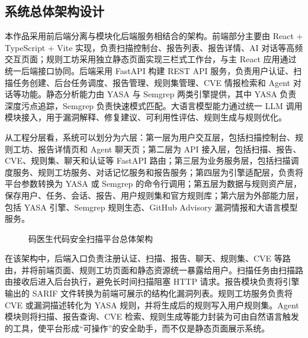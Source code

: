 \documentclass[a4paper,12pt,UTF8]{ctexart}
\numberwithin{figure}{section}
\numberwithin{table}{section}
\numberwithin{equation}{section}
\begin{document}
\subsection{系统总体架构设计}

{\songti
本作品采用前后端分离与模块化后端服务相结合的架构。前端部分主要由 React + TypeScript + Vite 实现，负责扫描控制台、报告列表、报告详情、AI 对话等高频交互页面；规则工坊采用独立静态页面实现三栏式工作台，与主 React 应用通过统一后端接口协同。后端采用 FastAPI 构建 REST API 服务，负责用户认证、扫描任务创建、后台任务调度、报告管理、规则集管理、CVE 情报检索和 Agent 对话等功能。静态分析能力由 YASA 与 Semgrep 两类引擎提供，其中 YASA 负责深度污点追踪，Semgrep 负责快速模式匹配。大语言模型能力通过统一 LLM 调用模块接入，用于漏洞解释、修复建议、可利用性评估、规则生成与规则优化。

从工程分层看，系统可以划分为六层：第一层为用户交互层，包括扫描控制台、规则工坊、报告详情页和 Agent 聊天页；第二层为 API 接入层，包括扫描、报告、CVE、规则集、聊天和认证等 FastAPI 路由；第三层为业务服务层，包括扫描调度服务、规则工坊服务、对话记忆服务和报告服务；第四层为引擎适配层，负责将平台参数转换为 YASA 或 Semgrep 的命令行调用；第五层为数据与规则资产层，保存用户、任务、会话、报告、用户规则集和官方规则库；第六层为外部能力层，包括 YASA 引擎、Semgrep 规则生态、GitHub Advisory 漏洞情报和大语言模型服务。
\par}

\begin{figure}[htbp]
\centering
{}
\caption{码医生代码安全扫描平台总体架构}
\label{fig:system-architecture}
\end{figure}

{\songti
在该架构中，后端入口负责注册认证、扫描、报告、聊天、规则集、CVE 等路由，并将前端页面、规则工坊页面和静态资源统一暴露给用户。扫描任务由扫描路由接收后进入后台执行，避免长时间扫描阻塞 HTTP 请求。报告模块负责将引擎输出的 SARIF 文件转换为前端可展示的结构化漏洞列表。规则工坊服务负责将 CVE 或漏洞描述转化为 YASA 规则，并将生成后的规则写入用户规则集。Agent 模块则将扫描、报告查询、CVE 检索、规则生成等能力封装为可由自然语言触发的工具，使平台形成“可操作”的安全助手，而不仅是静态页面展示系统。
\par}
\end{document}
